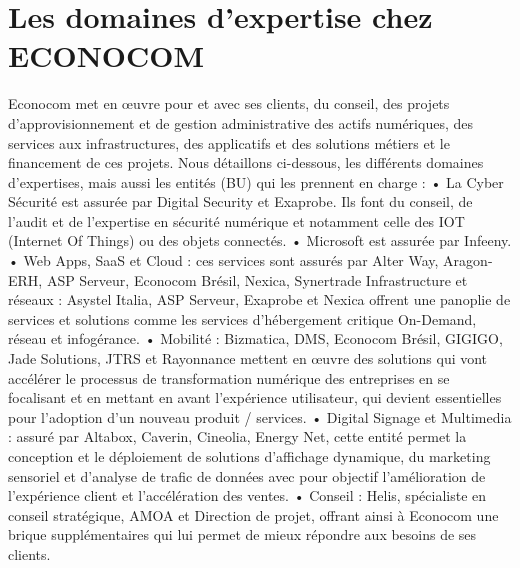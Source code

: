 \section{Les domaines d'expertise chez ECONOCOM}
Econocom met en œuvre pour et avec ses clients, du conseil, des projets  d’approvisionnement et de gestion administrative des actifs numériques, des services aux infrastructures, des applicatifs et des solutions métiers et le financement de ces projets.
Nous détaillons ci-dessous, les différents domaines d’expertises, mais aussi les entités (BU) qui les prennent en charge :
\newline
• La Cyber Sécurité est assurée par Digital Security et Exaprobe. Ils font du conseil, de l’audit et de l’expertise en sécurité numérique et notamment celle des IOT (Internet Of Things) ou des objets connectés.
\newline
•  Microsoft est assurée par Infeeny.
\newline
•  Web Apps, SaaS et Cloud : ces services sont assurés par Alter Way, Aragon-ERH, ASP Serveur, Econocom Brésil, Nexica, Synertrade Infrastructure et réseaux : Asystel Italia, ASP Serveur, Exaprobe et Nexica offrent une panoplie de services et solutions comme les services d’hébergement critique On-Demand, réseau et infogérance.
\newline
•  Mobilité : Bizmatica, DMS, Econocom Brésil, GIGIGO, Jade Solutions, JTRS et Rayonnance mettent en œuvre des solutions qui vont accélérer le processus de transformation numérique des entreprises en se focalisant et en mettant en avant l’expérience utilisateur, qui devient essentielles pour l’adoption d’un nouveau produit / services.
\newline
•  Digital Signage et Multimedia : assuré par Altabox, Caverin, Cineolia, Energy Net, cette entité permet la conception et le déploiement de solutions d’affichage dynamique, du marketing sensoriel et d’analyse de trafic de données avec pour objectif l’amélioration de l’expérience client et l’accélération des ventes.
\newline
• Conseil : Helis, spécialiste en conseil stratégique, AMOA et Direction de projet, offrant ainsi à Econocom une brique supplémentaires qui lui permet de mieux répondre aux besoins de ses clients.







